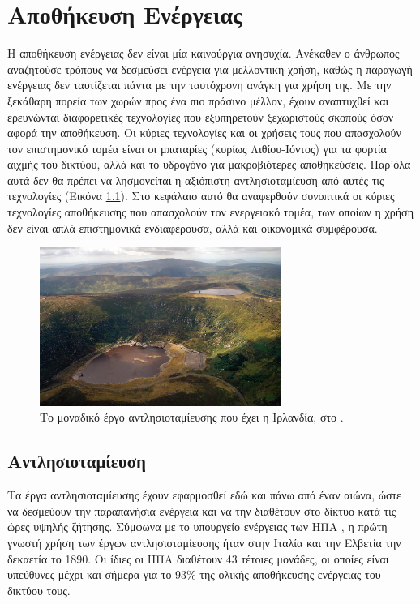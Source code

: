 \documentclass[12pt]{report}
\begin{document}
\chapter{Αποθήκευση Ενέργειας}
\label{chap:storage}
Η αποθήκευση ενέργειας δεν είναι μία καινούργια ανησυχία. Ανέκαθεν ο άνθρωπος αναζητούσε τρόπους να δεσμεύσει ενέργεια για μελλοντική χρήση, καθώς η παραγωγή ενέργειας δεν ταυτίζεται πάντα με την ταυτόχρονη ανάγκη για χρήση της. 
Με την ξεκάθαρη πορεία των χωρών προς ένα πιο πράσινο μέλλον, έχουν αναπτυχθεί και ερευνώνται διαφορετικές τεχνολογίες που εξυπηρετούν ξεχωριστούς σκοπούς όσον αφορά την αποθήκευση. 
Οι κύριες τεχνολογίες και οι χρήσεις τους που απασχολούν τον επιστημονικό τομέα
είναι οι μπαταρίες (κυρίως Λιθίου-Ιόντος) για τα φορτία αιχμής του δικτύου, αλλά και το υδρογόνο για μακροβιότερες αποθηκεύσεις. Παρ'όλα αυτά δεν θα πρέπει να λησμονείται η αξιόπιστη αντλησιοταμίευση από αυτές τις τεχνολογίες 
(Εικόνα \ref{fig:turlough-hill}). 
Στο κεφάλαιο αυτό θα αναφερθούν συνοπτικά οι κύριες τεχνολογίες αποθήκευσης που απασχολούν τον ενεργειακό τομέα, των οποίων η χρήση δεν είναι απλά επιστημονικά ενδιαφέρουσα, αλλά και οικονομικά συμφέρουσα.

\begin{figure}[h]
				\center
				\includegraphics[width=0.7\textwidth]{turlough-hill}
				\captionsetup{name=Εικόνα, width=0.8\textwidth}
				\caption{Το μοναδικό έργο αντλησιοταμίευσης που έχει η Ιρλανδία, στο {}.}
				\label{fig:turlough-hill}
\end{figure}
\pagebreak

\section{Αντλησιοταμίευση}
Τα έργα αντλησιοταμίευσης έχουν εφαρμοσθεί εδώ και πάνω από έναν αιώνα, ώστε να δεσμεύουν την παραπανήσια ενέργεια και να την διαθέτουν στο δίκτυο κατά τις ώρες υψηλής ζήτησης. 
Σύμφωνα με το υπουργείο ενέργειας των ΗΠΑ \parencite{energygov1801}, η πρώτη γνωστή χρήση των έργων αντλησιοταμίευσης ήταν στην Ιταλία και την Ελβετία την δεκαετία το 1890. Οι ίδιες οι ΗΠΑ διαθέτουν 43 τέτοιες μονάδες, οι
οποίες είναι υπεύθυνες μέχρι και σήμερα για το 93\% της ολικής αποθήκευσης ενέργειας του δικτύου τους. 
\end{document}
